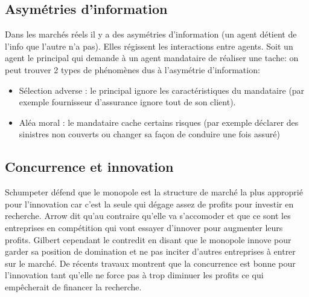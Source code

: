 
\subsection{Asymétries d'information} %
\label{sec:asymetries_d_information}

Dans les marchés réels il y a des asymétries d'information (un agent détient de l'info que l'autre n'a pas). Elles régissent les interactions entre agents. Soit un agent le principal qui demande à un agent mandataire de réaliser une tache: on peut trouver 2 types de phénomènes dus à l'asymétrie d'information:
\begin{itemize}
	\item Sélection adverse : le principal ignore les caractéristiques du mandataire (par exemple fournisseur d'assurance ignore tout de son client).
	\item Aléa moral : le mandataire cache certains risques (par exemple déclarer des sinistres non couverts ou changer sa façon de conduire une fois assuré)
\end{itemize}
\subsection{Concurrence et innovation} %
\label{sec:concurrence_et_innovation}

Schumpeter défend que le monopole est la structure de marché la plus approprié pour l'innovation car c'est la seule qui dégage assez de profits pour investir en recherche. Arrow dit qu'au contraire qu'elle va s'accomoder et que ce sont les entreprises en compétition qui vont essayer d'innover pour augmenter leurs profits. Gilbert cependant le contredit en disant que le monopole innove pour garder sa position de domination et ne pas inciter d'autres entreprises à entrer sur le marché. De récents travaux montrent que la concurrence est bonne pour l'innovation tant qu'elle ne force pas à trop diminuer les profits ce qui empêcherait de financer la recherche.






